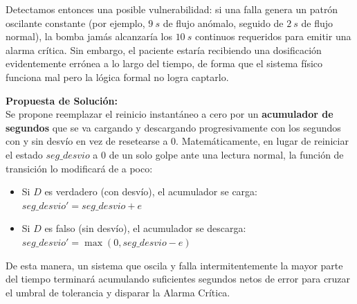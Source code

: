 Detectamos entonces una posible vulnerabilidad: si una falla genera un patrón oscilante constante (por ejemplo, $9~s$ de flujo anómalo, seguido de $2~s$ de flujo normal), la bomba jamás alcanzaría los $10~s$ continuos requeridos para emitir una alarma crítica. Sin embargo, el paciente estaría recibiendo una dosificación evidentemente errónea a lo largo del tiempo, de forma que el sistema físico funciona mal pero la lógica formal no logra captarlo.

\textbf{Propuesta de Solución:} \\
Se propone reemplazar el reinicio instantáneo a cero por un \textbf{acumulador de segundos} que se va cargando y descargando progresivamente con los segundos con y sin desvío en vez de resetearse a 0. Matemáticamente, en lugar de reiniciar el estado $seg\_desvio$ a $0$ de un solo golpe ante una lectura normal, la función de transición lo modificará de a poco:

\begin{itemize}
    \item Si $D$ es verdadero (con desvío), el acumulador se carga: $seg\_desvio' = seg\_desvio + e$
    \item Si $D$ es falso (sin desvío), el acumulador se descarga: $seg\_desvio' = \max(0, seg\_desvio - e)$
\end{itemize}

De esta manera, un sistema que oscila y falla intermitentemente la mayor parte del tiempo terminará acumulando suficientes segundos netos de error para cruzar el umbral de tolerancia y disparar la Alarma Crítica.
